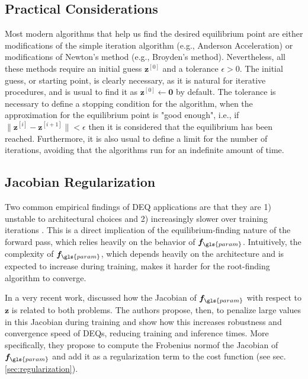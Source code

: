 \subsection{Practical Considerations}

Most modern algorithms that help us find the desired equilibrium point are either modifications of the simple iteration algorithm (e.g., Anderson Acceleration\cite{walker_anderson_2011}) or modifications of Newton's method (e.g., Broyden's method\cite{broyden_class_1965}).
Nevertheless, all these methods require an initial guess $\bm{z}^{[0]}$ and a tolerance $\epsilon>0$. 
The initial guess, or starting point, is clearly necessary, as it is natural for iterative procedures, and is usual to find it as $\bm{z}^{[0]}\gets \bm{0}$ by default.
The tolerance is necessary to define a stopping condition for the algorithm, when the approximation for the equilibrium point is "good enough", i.e., if $\|\bm{z}^{[i]}-\bm{z}^{[i+1]}\|<\epsilon$ then it is considered that the equilibrium has been reached.
Furthermore, it is also usual to define a limit for the number of iterations, avoiding that the algorithms run for an indefinite amount of time.

\subsection{Jacobian Regularization}

Two common empirical findings of \gls{DEQ} applications are that they are 1) unstable to architectural choices \cite{bai_stabilizing_2021} and 2) increasingly slower over training iterations \cite{Bai2019,winston_monotone_2020}.
This is a direct implication of the equilibrium-finding nature of the forward pass, which relies heavily on the behavior of $\bm{f}_{\gls{param}}$.
Intuitively, the complexity of $\bm{f}_{\gls{param}}$, which depends heavily on the architecture and is expected to increase during training, makes it harder for the root-finding algorithm to converge.

In a very recent work, \textcite{bai_stabilizing_2021} discussed how the Jacobian of $\bm{f}_{\gls{param}}$ with respect to $\bm{z}$ is related to both problems.
The authors propose, then, to penalize large values in this Jacobian during training and show how this increases robustness and convergence speed of \gls{DEQ}s, reducing training and inference times.
More specifically, they propose to compute the Frobenius norm\footnotemark of the Jacobian of $\bm{f}_{\gls{param}}$ and add it as a regularization term to the cost function (see sec. \ref{sec:regularization}).

